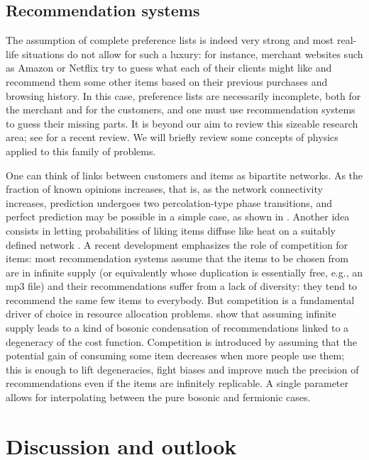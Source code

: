 \documentclass[aps,twocolumn,nofootinbib,sortedaddress,reprint]{revtex4-1}
\begin{document}
\subsection{Recommendation systems}

The assumption of complete preference lists is indeed very strong and
most real-life situations do not allow for such a luxury: for
instance, merchant websites such as Amazon or Netflix try to guess
what each of their clients might like and recommend them some other
items based on their previous purchases and browsing history. In this case,
preference lists are necessarily incomplete, both for the merchant and for the customers, and one must use
recommendation systems to guess their missing parts. It is beyond our
aim to review this sizeable research area; see
\textcite{lu2012recommender} for a recent review. We will briefly review
some concepts of physics applied to this family of problems.

 One can think of
links between customers and items as bipartite networks. As the
fraction of known opinions increases, that is, as the network
connectivity increases, prediction undergoes two percolation-type
phase transitions, and perfect prediction may be possible in a simple
case, as shown in \textcite{maslov2001extracting}.  Another idea
consists in letting probabilities of liking items diffuse like heat on a
suitably defined network \cite{zhang2007heat,zhou2010solving}.
A recent development emphasizes the role of
competition for items: most recommendation systems assume that the
items to be chosen from are in infinite supply (or equivalently whose
duplication is essentially free, e.g., an mp3 file) and their
recommendations suffer from a lack of diversity: they tend to
recommend the same few items to everybody. But competition is a
fundamental driver of choice in resource allocation
problems. \textcite{gualdi2013crowd} show that assuming infinite
supply leads to a kind of bosonic condensation of recommendations
linked to a degeneracy of the cost function. Competition is introduced
by assuming that the potential gain of consuming some item decreases
when more people use them; this is enough to lift degeneracies, fight
biases and improve much the precision of recommendations even if the
items are infinitely replicable. A single parameter allows for
interpolating between the pure bosonic and fermionic cases.


\section{Discussion and outlook}
\end{document}
